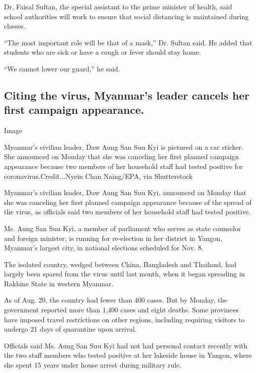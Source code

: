 Dr. Faisal Sultan, the special assistant to the prime minister of
health, said school authorities will work to ensure that social
distancing is maintained during classes.

``The most important role will be that of a mask,'' Dr. Sultan said. He
added that students who are sick or have a cough or fever should stay
home.

``We cannot lower our guard,'' he said.

\hypertarget{citing-the-virus-myanmars-leader-cancels-her-first-campaign-appearance}{%
\subsection{Citing the virus, Myanmar's leader cancels her first
campaign
appearance.}\label{citing-the-virus-myanmars-leader-cancels-her-first-campaign-appearance}}

Image

Myanmar's civilian leader, Daw Aung San Suu Kyi is pictured on a car
sticker. She announced on Monday that she was canceling her first
planned campaign appearance because two members of her household staff
had tested positive for coronavirus.Credit...Nyein Chan Naing/EPA, via
Shutterstock

Myanmar's civilian leader, Daw Aung San Suu Kyi, announced on Monday
that she was canceling her first planned campaign appearance because of
the spread of the virus, as officials said two members of her household
staff had tested positive.

Ms. Aung San Suu Kyi, a member of parliament who serves as state
counselor and foreign minister, is running for re-election in her
district in Yangon, Myanmar's largest city, in national elections
scheduled for Nov. 8.

The isolated country, wedged between China, Bangladesh and Thailand, had
largely been spared from the virus until last month, when it began
spreading in Rakhine State in western Myanmar.

As of Aug. 20, the country had fewer than 400 cases. But by Monday, the
government reported more than 1,400 cases and eight deaths. Some
provinces have imposed travel restrictions on other regions, including
requiring visitors to undergo 21 days of quarantine upon arrival.

Officials said Ms. Aung San Suu Kyi had not had personal contact
recently with the two staff members who tested positive at her lakeside
house in Yangon, where she spent 15 years under house arrest during
military rule.

